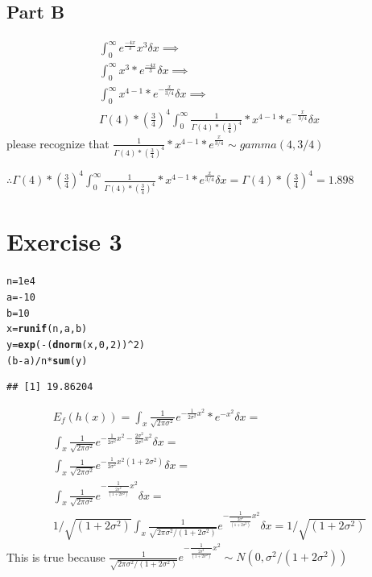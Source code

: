 \documentclass{article}\usepackage[]{graphicx}\usepackage[]{color}
\makeatletter
\newcommand{\hlnum}[1]{\textcolor[rgb]{0.686,0.059,0.569}{#1}}%
\newcommand{\hlopt}[1]{\textcolor[rgb]{0,0,0}{#1}}%
\newcommand{\hlstd}[1]{\textcolor[rgb]{0.345,0.345,0.345}{#1}}%
\newcommand{\hlkwb}[1]{\textcolor[rgb]{0.69,0.353,0.396}{#1}}%
\newcommand{\hlkwd}[1]{\textcolor[rgb]{0.737,0.353,0.396}{\textbf{#1}}}%
\newenvironment{kframe}{%
 \def\at@end@of@kframe{}%
 \ifinner\ifhmode%
  \def\at@end@of@kframe{\end{minipage}}%
  \begin{minipage}{\columnwidth}%
 \fi\fi%
 \def\FrameCommand##1{\hskip\@totalleftmargin \hskip-\fboxsep
 \colorbox{shadecolor}{##1}\hskip-\fboxsep
     \hskip-\linewidth \hskip-\@totalleftmargin \hskip\columnwidth}%
 \MakeFramed {\advance\hsize-\width
   \@totalleftmargin\z@ \linewidth\hsize
   \@setminipage}}%
 {\par\unskip\endMakeFramed%
 \at@end@of@kframe}
\newenvironment{knitrout}{}{} %
\makeatother
\begin{document}
\subsection*{Part B}
\begin{equation}
\begin{split}
\int_{0}^{\infty}e^{\frac{-4x}{3}}x^3\delta x \implies \\
\int_{0}^{\infty}x^3*e^{\frac{-4x}{3}}\delta x \implies \\
\int_{0}^{\infty}x^{4-1}*e^{-\frac{x}{3/4}}\delta x \implies \\
\Gamma(4)*(\frac{3}{4})^4\int_{0}^{\infty}\frac{1}{\Gamma(4)*(\frac{3}{4})^4}*x^{4-1}*e^{-\frac{x}{3/4}}\delta x
\end{split}
\end{equation}
please recognize that $\frac{1}{\Gamma(4)*(\frac{3}{4})^4}*x^{4-1}*e^{\frac{x}{3/4}}\sim gamma(4,3/4)$

$\therefore \Gamma(4)*(\frac{3}{4})^4\int_{0}^{\infty}\frac{1}{\Gamma(4)*(\frac{3}{4})^4}*x^{4-1}*e^{\frac{x}{3/4}}\delta x = \Gamma(4)*(\frac{3}{4})^4 = 1.898$
\section*{Exercise 3}
\begin{knitrout}
\color{fgcolor}\begin{kframe}
\begin{alltt}
\hlstd{n} \hlkwb{=} \hlnum{1e4}
\hlstd{a} \hlkwb{=} \hlopt{-}\hlnum{10}
\hlstd{b} \hlkwb{=} \hlnum{10}
\hlstd{x} \hlkwb{=} \hlkwd{runif}\hlstd{(n, a, b)}
\hlstd{y} \hlkwb{=} \hlkwd{exp}\hlstd{(}\hlopt{-}\hlstd{(}\hlkwd{dnorm}\hlstd{(x,} \hlnum{0}\hlstd{,} \hlnum{2}\hlstd{))}\hlopt{^}\hlnum{2}\hlstd{)}
\hlstd{(b}\hlopt{-}\hlstd{a)}\hlopt{/}\hlstd{n}\hlopt{*}\hlkwd{sum}\hlstd{(y)}
\end{alltt}
\begin{verbatim}
## [1] 19.86204
\end{verbatim}
\end{kframe}
\end{knitrout}
\begin{equation}
\begin{split}
E_{f}(h(x)) = \int_{x}\frac{1}{\sqrt{2\pi\sigma^{2}}}e^{-\frac{1}{2\sigma^2}x^2}*e^{-x^2} \delta x = \\
\int_{x}\frac{1}{\sqrt{2\pi\sigma^{2}}}e^{-\frac{1}{2\sigma^2}x^2 -\frac{2\sigma^2}{2\sigma^2}x^2} \delta x = \\
\int_{x}\frac{1}{\sqrt{2\pi\sigma^{2}}}e^{-\frac{1}{2\sigma^2}x^2(1+2\sigma^2)} \delta x = \\
\int_{x}\frac{1}{\sqrt{2\pi\sigma^{2}}}e^{-\frac{1}{\frac{2\sigma^2}{(1+2\sigma^2)}}x^2} \delta x = \\
1/\sqrt{(1+2\sigma^2)}\int_{x}\frac{1}{\sqrt{2\pi\sigma^{2}/(1+2\sigma^2)}}e^{-\frac{1}{\frac{2\sigma^2}{(1+2\sigma^2)}}x^2} \delta x =
1/\sqrt{(1+2\sigma^2)}
\end{split}
\end{equation}
This is true because $\frac{1}{\sqrt{2\pi\sigma^{2}/(1+2\sigma^2)}}e^{-\frac{1}{\frac{2\sigma^2}{(1+2\sigma^2)}}x^2}\sim N(0, \sigma^2/(1+2\sigma^2))$
\end{document}

